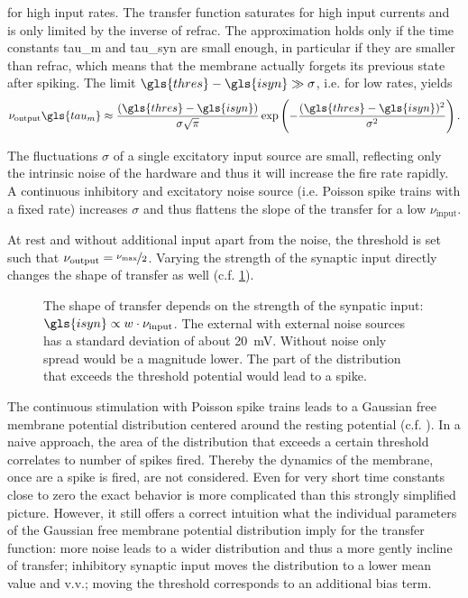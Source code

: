 for high input rates. The transfer function saturates for high input currents and is only limited by the inverse of \gls{refrac}. The approximation holds only if the time constants \gls{tau_m} and \gls{tau_syn} are small enough, in particular if they are smaller than \gls{refrac}, which means that the membrane actually forgets its previous state after spiking. The limit $\gls{thres} - \gls{isyn} \gg \sigma$, i.e. for low rates, yields
\begin{equation}\label{fireratelow}
\nu_\text{output} \gls{tau_m} \approx \frac{(\gls{thres} - \gls{isyn})}{\sigma \sqrt{\pi}} \exp\left(-\frac{(\gls{thres} - \gls{isyn})^2}{\sigma^2}\right).
\end{equation}

The fluctuations $\sigma$ of a single excitatory input source are small, reflecting only the intrinsic noise of the hardware and thus it will increase the fire rate rapidly. A continuous inhibitory and excitatory noise source (i.e. Poisson spike trains with a fixed rate) increases $\sigma$ and thus flattens the slope of the \gls{transfer} for a low $\nu_\text{input}$. 

At rest and without additional input apart from the noise, the threshold is set such that $\nu_\text{output} = \nicefrac{\nu_\text{max}}{2}$. Varying the strength of the synaptic input directly changes the shape of \gls{transfer} as well (c.f. \cref{transferfunction}).

\begin{figure}
	\label{transferfunction}
	\begin{center}
		
	\end{center}
	\caption{The shape of \gls{transfer} depends on the strength of the synpatic input: $\gls{isyn} \propto w \cdot \nu_\text{input}$. The external  with external noise sources has a standard deviation of about \SI{20}{\milli\V}. Without noise only spread would be a magnitude lower. The part of the distribution that exceeds the threshold potential would lead to a spike.}
\end{figure}

The continuous stimulation with Poisson spike trains leads to a Gaussian free membrane potential distribution centered around the resting potential (c.f. \cite{petrovici12phdthesis}). In a naive approach, the area of the distribution that exceeds a certain threshold correlates to number of spikes fired. Thereby the dynamics of the membrane, once are a spike is fired, are not considered. Even for very short time constants close to zero the exact behavior is more complicated than this strongly simplified picture. However, it still offers a correct intuition what the individual parameters of the Gaussian free membrane potential distribution imply for the transfer function: more noise leads to a wider distribution and thus a more gently incline of \gls{transfer}; inhibitory synaptic input moves the distribution to a lower mean value and v.v.; moving the threshold corresponds to an additional bias term.

